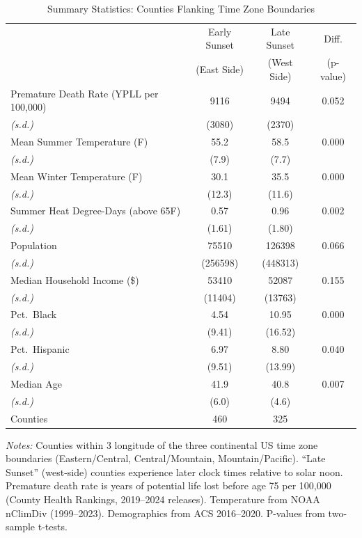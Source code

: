 \begin{table}[htbp]
\centering
\caption{Summary Statistics: Counties Flanking Time Zone Boundaries}
\label{tab:summary}
\small
\begin{tabular}{lccc}
\hline\hline
 & Early Sunset & Late Sunset & Diff. \\
 & (East Side) & (West Side) & (p-value) \\
\hline
Premature Death Rate (YPLL per 100,000) & 9116 & 9494 & 0.052 \\
\quad \textit{(s.d.)} & (3080) & (2370) & \\
Mean Summer Temperature (\textdegree{}F) & 55.2 & 58.5 & 0.000 \\
\quad \textit{(s.d.)} & (7.9) & (7.7) & \\
Mean Winter Temperature (\textdegree{}F) & 30.1 & 35.5 & 0.000 \\
\quad \textit{(s.d.)} & (12.3) & (11.6) & \\
Summer Heat Degree-Days (above 65\textdegree{}F) & 0.57 & 0.96 & 0.002 \\
\quad \textit{(s.d.)} & (1.61) & (1.80) & \\
Population & 75510 & 126398 & 0.066 \\
\quad \textit{(s.d.)} & (256598) & (448313) & \\
Median Household Income (\$) & 53410 & 52087 & 0.155 \\
\quad \textit{(s.d.)} & (11404) & (13763) & \\
Pct.\ Black & 4.54 & 10.95 & 0.000 \\
\quad \textit{(s.d.)} & (9.41) & (16.52) & \\
Pct.\ Hispanic & 6.97 & 8.80 & 0.040 \\
\quad \textit{(s.d.)} & (9.51) & (13.99) & \\
Median Age & 41.9 & 40.8 & 0.007 \\
\quad \textit{(s.d.)} & (6.0) & (4.6) & \\
\hline
Counties & 460 & 325 & \\
\hline\hline
\end{tabular}
\begin{tablenotes}[flushleft]\small
\item \textit{Notes:} Counties within 3\textdegree{} longitude of the three continental US time zone boundaries (Eastern/Central, Central/Mountain, Mountain/Pacific). ``Late Sunset'' (west-side) counties experience later clock times relative to solar noon. Premature death rate is years of potential life lost before age 75 per 100,000 (County Health Rankings, 2019--2024 releases). Temperature from NOAA nClimDiv (1999--2023). Demographics from ACS 2016--2020. P-values from two-sample t-tests.
\end{tablenotes}
\end{table}

